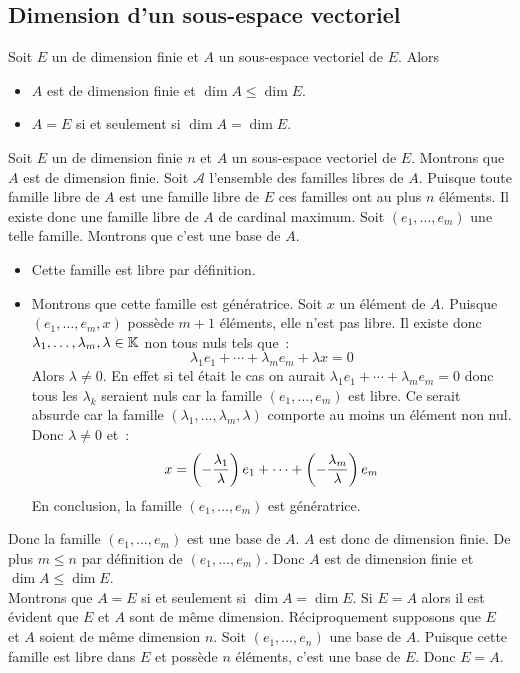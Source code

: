\documentclass{magnolia}
\begin{document}
\subsection{Dimension d'un sous-espace vectoriel}
\begin{proposition}[utile=3]
Soit $E$ un \Kev de dimension finie et $A$ un sous-espace vectoriel de $E$.
Alors
\begin{itemize}
\item $A$ est de dimension finie et $\dim A\leq \dim E$.
\item $A=E$ si et seulement si $\dim A=\dim E$.
\end{itemize}
\end{proposition}
\begin{preuve}
Soit $E$ un \Kev de dimension finie $n$ et $A$ un sous-espace vectoriel de $E$.
Montrons que $A$ est de dimension finie. Soit $\mathcal{A}$ l'ensemble des
familles libres de $A$. Puisque toute famille libre de $A$ est une famille
libre de $E$ ces familles ont au plus $n$ éléments. Il existe donc une
famille libre de $A$ de cardinal maximum. Soit $(e_1,\ldots,e_m)$ une telle
famille. Montrons que c'est une base de $A$.
\begin{itemize}
\item Cette famille est libre par définition.
\item Montrons que cette famille est génératrice. Soit $x$ un élément de $A$.
  Puisque $(e_1,\ldots,e_m,x)$ possède $m+1$ éléments, elle n'est pas libre.
  Il existe donc $\lambda_1,\ldots,\lambda_m,\lambda\in\mathbb{K}$ non tous nuls tels
  que~:
  \[\lambda_1 e_1+\cdots+\lambda_m e_m +\lambda x=0\]
  Alors $\lambda\neq 0$. En effet si tel était le cas on aurait
  $\lambda_1 e_1+\cdots+\lambda_m e_m=0$ donc tous les $\lambda_k$ seraient
  nuls car la famille $(e_1,\ldots,e_m)$ est libre. Ce serait absurde car
  la famille $(\lambda_1,\ldots,\lambda_m,\lambda)$ comporte au moins un élément
  non nul. Donc $\lambda\neq 0$ et~:
  \[x=\left(-\frac{\lambda_1}{\lambda}\right)e_1+\cdots+
      \left(-\frac{\lambda_m}{\lambda}\right)e_m\]
  En conclusion, la famille $(e_1,\ldots,e_m)$ est génératrice.
\end{itemize}
Donc la famille $(e_1,\ldots,e_m)$ est une base de $A$. $A$ est donc de dimension
finie. De plus $m\leq n$ par définition de $(e_1,\ldots,e_m)$. Donc $A$ est de
dimension finie et $\dim A\leq \dim E$.\\
Montrons que $A=E$ si et seulement si $\dim A=\dim E$. Si $E=A$ alors il est
évident que $E$ et $A$ sont de même dimension. Réciproquement supposons que
$E$ et $A$ soient de même dimension $n$. Soit $(e_1,\ldots,e_n)$ une base de
$A$. Puisque cette famille est libre dans $E$ et possède $n$ éléments, c'est
une base de $E$. Donc $E=A$.
\end{preuve}
\end{document}

